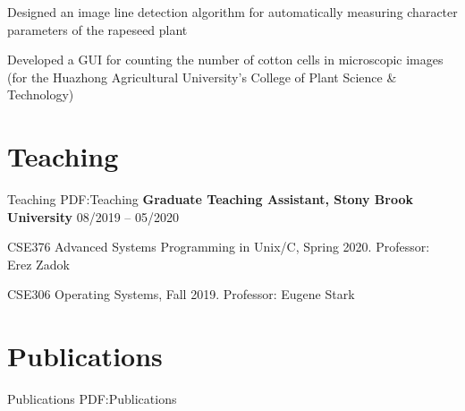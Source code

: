 \documentclass[letterpaper,10pt,oneside]{article}
\begin{document}
\begin{body}
\GapNoBreak
\BulletItem
Designed an image line detection algorithm for automatically measuring character parameters of the rapeseed plant

\GapNoBreak
\BulletItem
Developed a GUI for counting the number of cotton cells in microscopic images (for the Huazhong Agricultural University's College of Plant Science \& Technology)


\section
{Teaching}
{Teaching}
{PDF:Teaching}
\textbf{Graduate Teaching Assistant, Stony Brook University}
\hfill
08/2019 --
05/2020

\GapNoBreak
\BulletItem
CSE376 Advanced Systems Programming in Unix/C, Spring 2020. Professor: Erez Zadok

\GapNoBreak
\BulletItem
CSE306 Operating Systems, Fall 2019. Professor: Eugene Stark



\section
{Publications}
{Publications}
{PDF:Publications}

\iffalse
\subsection
{Journals}
{Journals}
{PDF:Journals}

\GapNoBreak
\NumberedItem{[11]}
\href{http://www.example.com/my-paper-doi-5}
{\underline{J.~Doe}, J.~Citizen, and A.~Yone,
``On lasers and climate change,''
\textit{Journal of Science},
vol.~89,
no.~2,
pp.~4123--4133,
\DatestampYM{2008}{02}.}

\Gap
\NumberedItem{{\CharSpace}[1]}
\href{http://www.example.com/my-paper-doi-4}
{\underline{J.~Doe} and J.~Citizen,
``Measuring the extent of climate change,''
\textit{Global Scientific Journal},
vol.~12,
no.~4,
pp.~330--352,
\DatestampYM{2006}{12}.}
\fi



\end{body}
\end{document}
